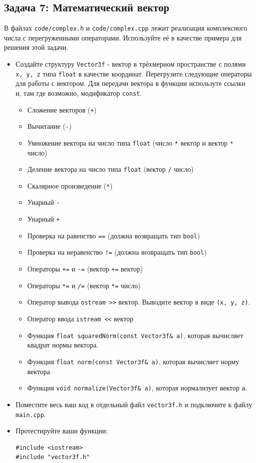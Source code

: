 \documentclass{article}
\begin{document}
\subsection*{Задача 7: Математический вектор}
В файлах \texttt{code/complex.h} и \texttt{code/complex.cpp} лежит реализация комплексного числа с перегруженными операторами. Используйте её в качестве примера для решения этой задачи.
\begin{itemize}
\item Создайте структуру \texttt{Vector3f} - вектор в трёхмерном пространстве с полями \texttt{x, y, z} типа \texttt{float} в качестве координат. Перегрузите следующие операторы для работы с вектором. Для передачи вектора в функции используте ссылки и, там где возможно, модификатор \texttt{const}.
	\begin{itemize}
	\item Сложение векторов (\texttt{+})
	\item Вычитание (\texttt{-})
	\item Умножение вектора на число типа \texttt{float} (число \texttt{*} вектор и вектор \texttt{*} число)
	\item Деление вектора на число типа \texttt{float} (вектор \texttt{/} число)
	\item Скалярное произведение (\texttt{*})
	\item Унарный \texttt{-}
	\item Унарный \texttt{+}
	\item Проверка на равенство \texttt{==}  (должна возвращать тип \texttt{bool})
	\item Проверка на неравенство \texttt{!=}  (должна возвращать тип \texttt{bool})
	\item Операторы \texttt{+=} и \texttt{-=}  (вектор \texttt{+=} вектор)
	\item Операторы \texttt{*=} и \texttt{/=}  (вектор \texttt{*=} число)
	\item Оператор вывода  \texttt{ostream >{}>} вектор. Выводите вектор в виде \texttt{(x, y, z)}.
	\item Оператор ввода  \texttt{istream <{}<} вектор
	\item Функция \texttt{float squaredNorm(const Vector3f\& a)}, которая вычисляет квадрат нормы вектора.
	\item Функция \texttt{float norm(const Vector3f\& a)}, которая вычисляет норму вектора.
	\item Функция \texttt{void normalize(Vector3f\& a)}, которая нормализует вектор \texttt{a}.
	\end{itemize}
\item Поместите весь ваш код в отдельный файл \texttt{vector3f.h} и подключите к файлу \texttt{main.cpp}.
\item Протестируйте ваши функции:
\begin{lstlisting}
#include <iostream>
#include "vector3f.h"


\end{lstlisting}
\end{itemize}
\end{document}
